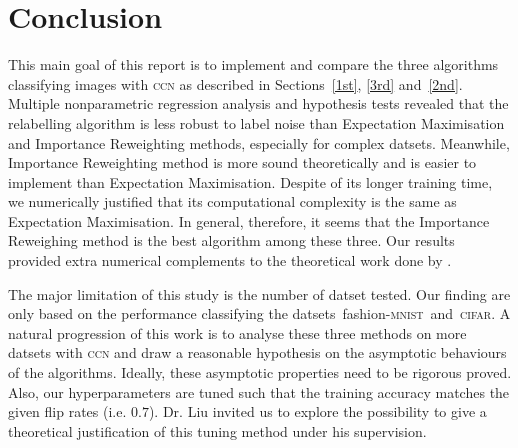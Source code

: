 \documentclass[12pt]{article} %
\newcommand{\rhoo}{\rho_{+1}}
\newcommand{\rhoz}{\rho_{-1}}
\newcommand{\mnist}{fashion-\textsc{mnist}\ }
\begin{document}




\section{Conclusion}
This main goal of this report is to implement and compare the three algorithms classifying images with \textsc{ccn} as described in Sections~\ref{1st}, \ref{3rd} and~\ref{2nd}. 
Multiple nonparametric regression analysis and hypothesis tests revealed that the relabelling algorithm is less robust to label noise than Expectation Maximisation and Importance Reweighting methods, especially for complex datsets. Meanwhile, Importance Reweighting method is more sound theoretically \citep{liu2016classification} and is easier to implement than Expectation Maximisation. 
Despite of its longer training time, we numerically justified that its computational complexity is the same as Expectation Maximisation.
In general, therefore, it seems that the Importance Reweighing method is the best algorithm among these three. 
Our results provided extra numerical complements to the theoretical work done by \citet{liu2016classification}. 

The major limitation of this study is the number of datset tested. Our finding are only based on the performance classifying the datsets~\mnist and~\textsc{cifar}. A natural progression of this work is to analyse these three methods on more datsets with \textsc{ccn} and draw a reasonable hypothesis on the asymptotic behaviours of the algorithms. Ideally, these asymptotic properties need to be rigorous proved. Also, our hyperparameters are tuned such that the training accuracy matches the given flip rates (i.e. $0.7$). Dr. Liu invited us to explore the possibility to give a theoretical justification of this tuning method under his supervision.
\label{headings}



\end{document}
